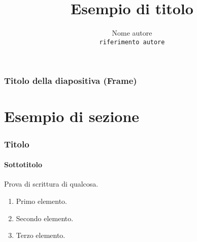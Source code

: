 \documentclass{beamer}
\title{Esempio di titolo}
\author{Nome autore \\ \texttt{riferimento autore}}
\institute{Nome istituto}
\begin{document}
	\begin{frame} 
		\maketitle 
	\end{frame}

	\begin{frame} 
		\frametitle{Titolo della diapositiva (Frame)} 
		\tableofcontents 
	\end{frame}

	\section{Esempio di sezione} 
	\begin{frame} 
		\frametitle{Titolo} 
		\framesubtitle{Sottotitolo} 

			Prova di scrittura di qualcosa. 
	
		\begin{enumerate}
			\item Primo elemento. 
			\item Secondo elemento.
			\item Terzo elemento.
			\qedhere 
		\end{enumerate} 

\end{frame}
\end{document}
